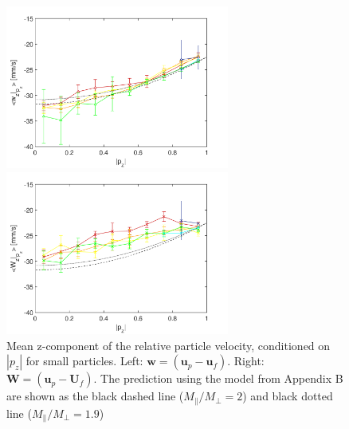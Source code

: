 \documentclass[]{jfm}
\begin{document}
\begin{figure}
\centering
\begin{minipage}{.5\textwidth}
  \centering
  \includegraphics[width=2.9in]{figures/wz-local-small.pdf}
\end{minipage}%
\begin{minipage}{.5\textwidth}
  \centering
  \includegraphics[width=2.9in]{figures/wz-U-small.pdf}
\end{minipage}
\caption{Mean z-component of the relative particle velocity, conditioned on $|p_z|$ for small particles. Left: $\mathbf{w}{=}(\mathbf{u}_p{-}\mathbf{u}_f)$. Right: $\mathbf{W}{=}(\mathbf{u}_p{-}\mathbf{U}_f)$. The prediction using the model from Appendix B are shown as the black dashed line ($M_\parallel/M_\perp{=}2$) and black dotted line ($M_\parallel/M_\perp{=}1.9$)}
\label{Fig:wz}
\end{figure}
\end{document}
